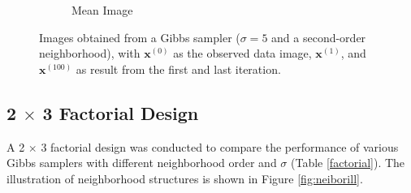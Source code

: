 \begin{figure}[h]
\begin{subfigure}[b]{0.24\textwidth}
            \caption[]%
            {{\small Mean Image}}    
            \label{fig:5d2mean}
        \end{subfigure}
        \caption[]
        {\small Images obtained from a Gibbs sampler ($\sigma=5$ and a second-order neighborhood), with $\mathbf{x}^{(0)}$ as the observed data image, $\mathbf{x}^{(1)}$, and $\mathbf{x}^{(100)}$ as result from the first and last iteration. }
        \label{fig:5d2}
    \end{figure}
\subsection{2 $\times$ 3 Factorial Design}
A 2 $\times$ 3 factorial design was conducted to compare the performance of various Gibbs samplers with different neighborhood order and $\sigma$ (Table \ref{factorial}). 
The illustration of neighborhood structures is shown in Figure \ref{fig:neiborill}.
